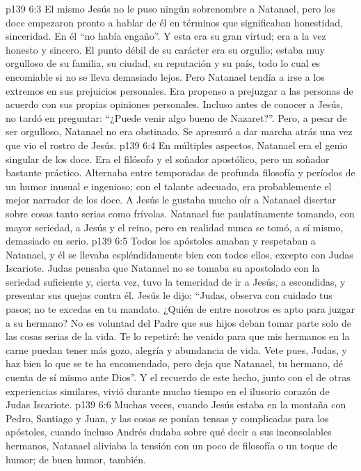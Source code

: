 \vs p139 6:3 \pc El mismo Jesús no le puso ningún sobrenombre a Natanael, pero los doce empezaron pronto a hablar de él en términos que significaban honestidad, sinceridad. En él “no había engaño”. Y esta era su gran virtud; era a la vez honesto y sincero. El punto débil de su carácter era su orgullo; estaba muy orgulloso de su familia, su ciudad, su reputación y su país, todo lo cual es encomiable si no se lleva demasiado lejos. Pero Natanael tendía a irse a los extremos en sus prejuicios personales. Era propenso a prejuzgar a las personas de acuerdo con sus propias opiniones personales. Incluso antes de conocer a Jesús, no tardó en preguntar: “¿Puede venir algo bueno de Nazaret?”. Pero, a pesar de ser orgulloso, Natanael no era obstinado. Se apresuró a dar marcha atrás una vez que vio el rostro de Jesús.
\vs p139 6:4 En múltiples aspectos, Natanael era el genio singular de los doce. Era el filósofo y el soñador apostólico, pero un soñador bastante práctico. Alternaba entre temporadas de profunda filosofía y períodos de un humor inusual e ingenioso; con el talante adecuado, era probablemente el mejor narrador de los doce. A Jesús le gustaba mucho oír a Natanael disertar sobre cosas tanto serias como frívolas. Natanael fue paulatinamente tomando, con mayor seriedad, a Jesús y el reino, pero en realidad nunca se tomó, a sí mismo, demasiado en serio.
\vs p139 6:5 Todos los apóstoles amaban y respetaban a Natanael, y él se llevaba espléndidamente bien con todos ellos, excepto con Judas Iscariote. Judas pensaba que Natanael no se tomaba su apostolado con la seriedad suficiente y, cierta vez, tuvo la temeridad de ir a Jesús, a escondidas, y presentar sus quejas contra él. Jesús le dijo: “Judas, observa con cuidado tus pasos; no te excedas en tu mandato. ¿Quién de entre nosotros es apto para juzgar a su hermano? No es voluntad del Padre que sus hijos deban tomar parte solo de las cosas serias de la vida. Te lo repetiré: he venido para que mis hermanos en la carne puedan tener más gozo, alegría y abundancia de vida. Vete pues, Judas, y haz bien lo que se te ha encomendado, pero deja que Natanael, tu hermano, dé cuenta de sí mismo ante Dios”. Y el recuerdo de este hecho, junto con el de otras experiencias similares, vivió durante mucho tiempo en el ilusorio corazón de Judas Iscariote.
\vs p139 6:6 Muchas veces, cuando Jesús estaba en la montaña con Pedro, Santiago y Juan, y las cosas se ponían tensas y complicadas para los apóstoles, cuando incluso Andrés dudaba sobre qué decir a sus inconsolables hermanos, Natanael aliviaba la tensión con un poco de filosofía o un toque de humor; de buen humor, también.
